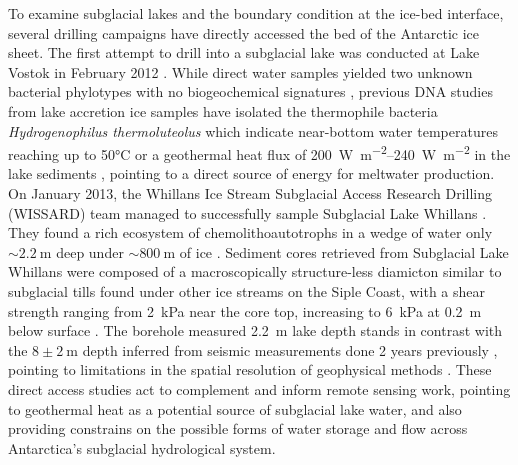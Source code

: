 To examine subglacial lakes and the boundary condition at the ice-bed interface, several drilling campaigns have directly accessed the bed of the Antarctic ice sheet.
The first attempt to drill into a subglacial lake was conducted at Lake Vostok in February 2012 \citep{LukinTechnologicalaspectsfinal2014}.
While direct water samples yielded two unknown bacterial phylotypes with no biogeochemical signatures \citep{BulatMicrobiologysubglacialLake2016}, previous DNA studies from lake accretion ice samples have isolated the thermophile bacteria \emph{Hydrogenophilus thermoluteolus} which indicate near-bottom water temperatures reaching up to 50°C or a geothermal heat flux of \SIrange{200}{240}{\watt\per\metre\squared} in the lake sediments \citep{BulatDNAsignaturethermophilic2004,BulatProspectslifesubglacial2012,TalalayGeothermalheatflux2020}, pointing to a direct source of energy for meltwater production.
On January 2013, the Whillans Ice Stream Subglacial Access Research Drilling (WISSARD) team managed to successfully sample Subglacial Lake Whillans \citep{TulaczykWISSARDSubglacialLake2014}.
They found a rich ecosystem of chemolithoautotrophs in a wedge of water only $\sim\SI{2.2}{\metre}$ deep under $\sim\SI{800}{\metre}$ of ice \citep{ChristnermicrobialecosystemWest2014,MikuckiSubglacialLakeWhillans2016}.
Sediment cores retrieved from Subglacial Lake Whillans were composed of a macroscopically structure-less diamicton similar to subglacial tills found under other ice streams on the Siple Coast, with a shear strength ranging from \SI{2}{\kilo\pascal} near the core top, increasing to \SI{6}{\kilo\pascal} at \SI{0.2}{\metre} below surface \citep{TulaczykWISSARDSubglacialLake2014}.
The borehole measured \SI{2.2}{\metre} lake depth stands in contrast with the $8\pm\SI{2}{\metre}$ depth inferred from seismic measurements done 2 years previously \citep{HorganSubglacialLakeWhillans2012}, pointing to limitations in the spatial resolution of geophysical methods \citep{TulaczykWISSARDSubglacialLake2014}.
These direct access studies act to complement and inform remote sensing work, pointing to geothermal heat as a potential source of subglacial lake water, and also providing constrains on the possible forms of water storage and flow across Antarctica's subglacial hydrological system.



